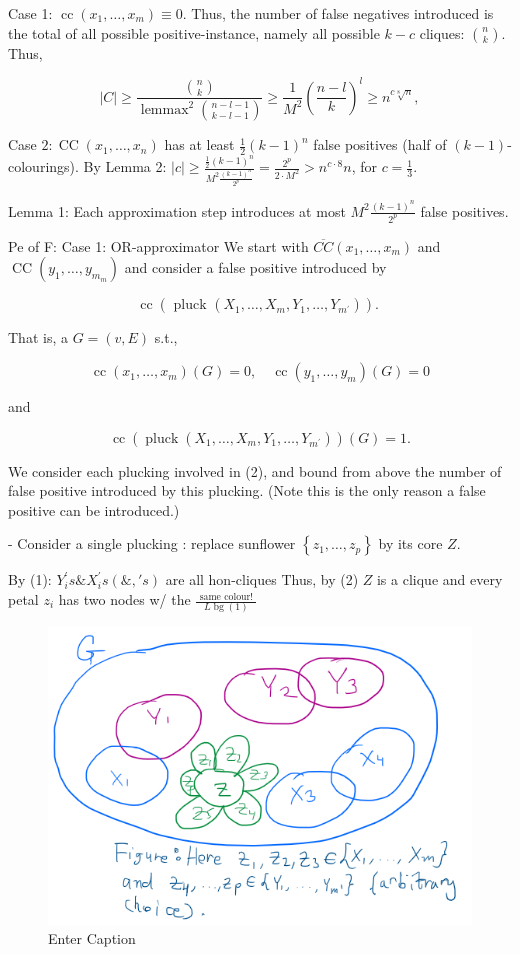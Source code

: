 Case 1: $\operatorname{cc}\left(x_1, \ldots, x_m\right) \equiv 0$.
Thus, the number of false negatives introduced is the total of all possible positive-instance, namely all possible $k-c$ cliques: $\binom{n}{k}$.
Thus,

$$
|C| \geq \frac{\binom{n}{k}}{\operatorname{lemmax}^2\binom{n-l-1}{k-l-1}} \geq \frac{1}{M^2}\left(\frac{n-l}{k}\right)^l \geq n^{c \sqrt[8]{n}},
$$


Case $2: \operatorname{CC}\left(x_1, \ldots, x_n\right)$ has at least $\frac{1}{2}(k-1)^n$ false positives (half of $(k-1)$-colourings).
By Lemma 2: $|c| \geq \frac{\frac{1}{2}(k-1)^n}{M^2 \frac{(k-1)^n}{2^p}}=\frac{2^p}{2 \cdot M^2}>n^{c \cdot 8} n$, for $c=\frac{1}{3}$.



Lemma 1: Each approximation step introduces at most $M^2 \frac{(k-1)^n}{2^p}$ false positives.

Pe of F: Case 1: OR-approximator
We start with $\overline{C C}\left(x_1, \ldots, x_m\right)$ and $\operatorname{CC}\left(y_1, \ldots, y_{m_m}\right)$ and consider a false positive introduced by

$$
\operatorname{cc}\left(\text { pluck }\left(X_1, \ldots, X_m, Y_1, \ldots, Y_{m^{\prime}}\right)\right) \text {. }
$$


That is, a $G=(v, E)$ s.t.,

$$
\operatorname{cc}\left(x_1, \ldots, x_m\right)(G)=0, \quad \operatorname{cc}\left(y_1, \ldots, y_m\right)(G)=0
$$

and

$$
\operatorname{cc}\left(\operatorname{pluck}\left(X_1, \ldots, X_m, Y_1, \ldots, Y_{m^{\prime}}\right)\right)(G)=1 .
$$


We consider each plucking involved in (2), and bound from above the number of false positive introduced by this plucking. (Note this is the only reason a false positive can be introduced.)


 - Consider a single plucking : replace sunflower $\left\{z_1, \ldots, z_p\right\}$ by its core $Z$.

By (1): $Y_i^{\prime} s \& X_i^{\prime} s(\&, ' s)$
are all hon-cliques
Thus, by (2)
$Z$ is a clique
and every petal $z_i$
has two nodes w/ the $\frac{\text { same colour! }}{L \operatorname{bg}(1)}$



\begin{figure}[H]
    \centering
    \includegraphics[width=.6\linewidth]{images/clique3.png}
    \caption{Enter Caption}
    \label{fig:enter-label}
\end{figure}


